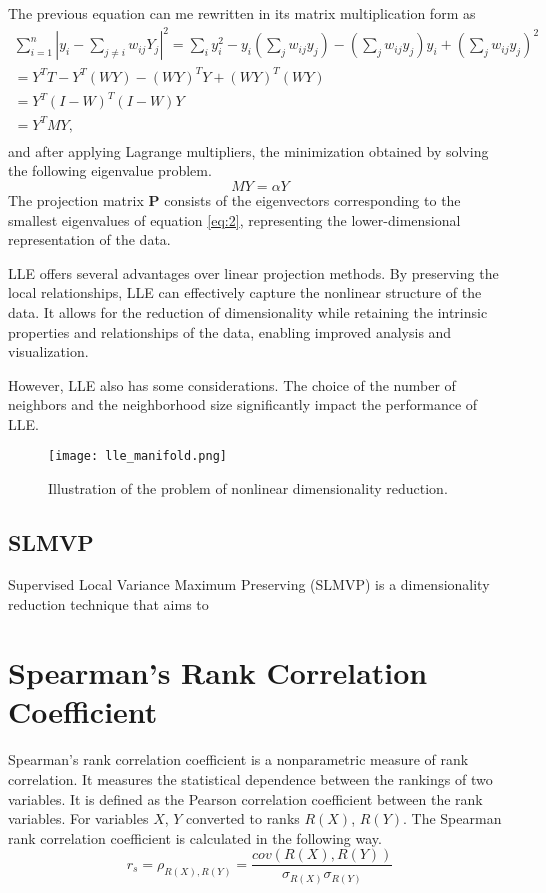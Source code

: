 The previous equation can me rewritten in its matrix multiplication form as
\begin{multline}
    \sum^n_{i=1} |y_i - \sum_{j \neq i} w_{ij} Y_j |^2 = \sum_i y_i^2 - y_i (\sum_j w_{ij}y_j) - (\sum_j w_{ij}y_j)y_i + (\sum_j w_{ij}y_j)^2 \\
    = Y^T T - Y^T (WY) - (WY)^T Y + (WY)^T (WY) \\
    = Y^T (I - W)^T (I-W)Y \\
    = Y^T M Y, \\
\end{multline}
and after applying Lagrange multipliers, the minimization obtained by solving the following eigenvalue problem.
\begin{equation} \label{eq:2}
    MY = \alpha Y
\end{equation}
The projection matrix $\mathbf{P}$ consists of the eigenvectors corresponding to the smallest eigenvalues of equation \ref{eq:2}, representing the lower-dimensional representation of the data.

LLE offers several advantages over linear projection methods. By preserving the local relationships, LLE can effectively capture the nonlinear structure of the data. It allows for the reduction of dimensionality while retaining the intrinsic properties and relationships of the data, enabling improved analysis and visualization.

However, LLE also has some considerations. The choice of the number of neighbors and the neighborhood size significantly impact the performance of LLE.

\begin{figure}
    \centering
    \texttt{[image: lle\_manifold.png]}
    \caption{Illustration of the problem of nonlinear dimensionality reduction.}
    \label{fig:lle_manifold}
\end{figure}

\subsection{SLMVP}
Supervised Local Variance Maximum Preserving (SLMVP) is a dimensionality reduction technique that aims to


\section{Spearman's Rank Correlation Coefficient}
Spearman's rank correlation coefficient is a nonparametric measure of rank correlation. It measures the statistical dependence between the rankings of two variables. It is defined as the Pearson correlation coefficient between the rank variables. For variables $X$, $Y$ converted to ranks $R(X)$, $R(Y)$. The Spearman rank correlation coefficient is calculated in the following way.
\begin{equation}
    r_s = \rho_{R(X), R(Y)} = \frac{cov(R(X),R(Y))}{\sigma_{R(X)} \sigma_{R(Y)}}
\end{equation}

